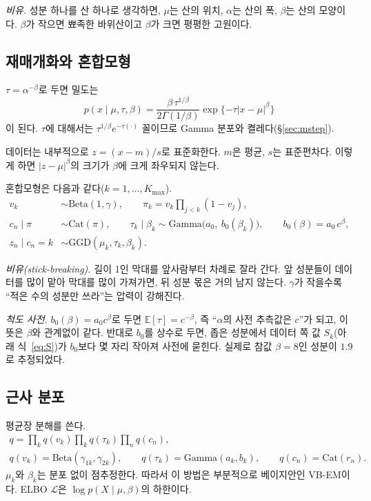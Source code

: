 \documentclass[11pt]{article}
\newcommand{\E}{\mathbb{E}}
\newcommand{\Ga}{\mathrm{Gamma}}
\newcommand{\Be}{\mathrm{Beta}}
\begin{document}
\emph{비유.} 성분 하나를 산 하나로 생각하면, $\mu$는 산의 위치, $\alpha$는 산의 폭, $\beta$는 산의 모양이다. $\beta$가 작으면 뾰족한 바위산이고 $\beta$가 크면 평평한 고원이다.

\subsection{재매개화와 혼합모형}
$\tau=\alpha^{-\beta}$로 두면 밀도는
\begin{equation}
  p(x\mid\mu,\tau,\beta)=\frac{\beta\,\tau^{1/\beta}}{2\Gamma(1/\beta)}\exp\{-\tau|x-\mu|^{\beta}\}
\end{equation}
이 된다. $\tau$에 대해서는 $\tau^{1/\beta}e^{-\tau(\cdot)}$ 꼴이므로 Gamma 분포와 켤레다(\S\ref{sec:mstep}).

데이터는 내부적으로 $z=(x-m)/s$로 표준화한다. $m$은 평균, $s$는 표준편차다. 이렇게 하면 $|z-\mu|^{\beta}$의 크기가 $\beta$에 크게 좌우되지 않는다.

혼합모형은 다음과 같다($k=1,\dots,K_{\max}$).
\begin{align}
  v_k &\sim \Be(1,\gamma), \qquad \pi_k = v_k\textstyle\prod_{j<k}(1-v_j), \label{eq:stick}\\
  c_n\mid\pi &\sim \mathrm{Cat}(\pi), \qquad
  \tau_k\mid\beta_k \sim \Ga\big(a_0,\ b_0(\beta_k)\big),\qquad b_0(\beta)=a_0\,c^{\beta},\\
  z_n\mid c_n=k &\sim \mathrm{GGD}(\mu_k,\tau_k,\beta_k).
\end{align}

\emph{비유(stick-breaking).} 길이 1인 막대를 앞사람부터 차례로 잘라 간다. 앞 성분들이 데이터를 많이 맡아 막대를 많이 가져가면, 뒤 성분 몫은 거의 남지 않는다. $\gamma$가 작을수록 ``적은 수의 성분만 쓰라''는 압력이 강해진다.

\emph{척도 사전.} $b_0(\beta)=a_0c^{\beta}$로 두면 $\E[\tau]=c^{-\beta}$, 즉 ``$\alpha$의 사전 추측값은 $c$''가 되고, 이 뜻은 $\beta$와 관계없이 같다.
반대로 $b_0$를 상수로 두면, 좁은 성분에서 데이터 쪽 값 $S_k$(아래 식~\eqref{eq:S})가 $b_0$보다 몇 자리 작아져 사전에 묻힌다. 실제로 참값 $\beta=8$인 성분이 $1.9$로 추정되었다.

\subsection{근사 분포}
평균장 분해를 쓴다.
\begin{gather}
  q=\prod_k q(v_k)\prod_k q(\tau_k)\prod_n q(c_n),\\
  q(v_k)=\Be(\gamma_{1k},\gamma_{2k}),\qquad q(\tau_k)=\Ga(a_k,b_k),\qquad q(c_n)=\mathrm{Cat}(r_n).
\end{gather}
$\mu_k$와 $\beta_k$는 분포 없이 점추정한다. 따라서 이 방법은 부분적으로 베이지안인 VB-EM이다.
ELBO $\mathcal{L}$은 $\log p(X\mid\mu,\beta)$의 하한이다.
\end{document}
